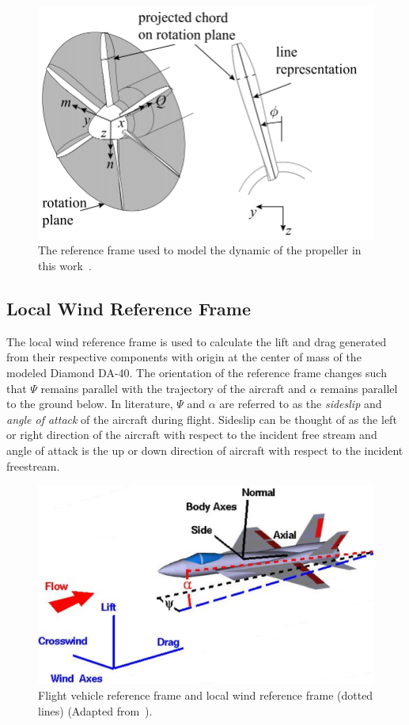 \begin{figure}[!ht]
    \centering
    \includegraphics[width=0.75\linewidth]{Figures/propframe.png}
    \caption{The reference frame used to model the dynamic of the propeller in this work~\cite{vanarnhemEngineeringMethodEstimate2020}.}\label{fig:propframe}
\end{figure}

\subsection{Local Wind Reference Frame}
The local wind reference frame is used to calculate the lift and drag generated from their respective components with origin at the center of mass of the modeled Diamond DA-40. The orientation of the reference frame changes such that \(\Psi \) remains parallel with the trajectory of the aircraft and \(\alpha \) remains parallel to the ground below. In literature, \( \Psi \) and \(\alpha \) are referred to as the \textit{sideslip} and \textit{angle of attack} of the aircraft during flight. Sideslip can be thought of as the left or right direction of the aircraft with respect to the incident free stream and angle of attack is the up or down direction of aircraft with respect to the incident freestream.

\begin{figure}[!ht]
    \centering
    \includegraphics[width=0.75\linewidth]{Figures/windaxes.png}
    \caption{Flight vehicle reference frame and local wind reference frame (dotted lines) (Adapted from~\cite{ForceBalanceCoordinates}).}\label{fig:windframe}
\end{figure}

